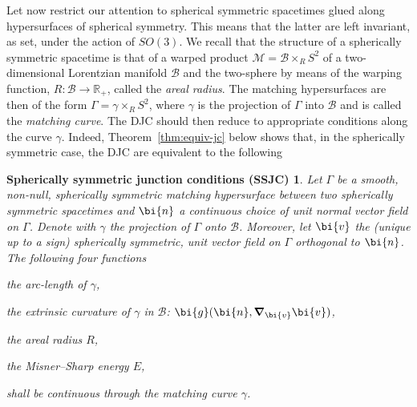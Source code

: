 \documentclass
[rmp,aps,twocolumn,showpacs,preprintnumbers,amsmath,amssymb]{revtex4}
\theoremstyle{plain}
\newtheorem*{SSJC}{Spherically symmetric junction conditions (SSJC)}
\theoremstyle{definition}
\theoremstyle{remark}
\newcommand{\bnabla}{\boldsymbol{\nabla}}     %
\newcommand{\M}{\mathcal{M}}                      %
\newcommand{\B}{\mathcal{B}}                      %
\newcommand{\Stwo}{{S^2}}                         %
\newcommand{\g}{\bg}                            %
\newcommand{\bg}{\bi{g}}
\newcommand{\bn}{\bi{n}}
\newcommand{\bv}{\bi{v}}
\begin{document}
Let now restrict our attention to spherical symmetric spacetimes 
glued along hypersurfaces of spherical symmetry. This means that 
the latter are left invariant, as set, under the action of $SO(3)$. 
We recall that the structure of a spherically symmetric spacetime 
is that of a warped product $\M=\B\times_R\Stwo$ of a two-dimensional 
Lorentzian manifold $\B$ and the two-sphere by means of the warping 
function, $R:\B\rightarrow\mathbb{R}_+$, called the \emph{areal radius}.
The matching hypersurfaces are then of the form 
$\varGamma=\gamma\times_R\Stwo$, where $\gamma$ is the projection 
of $\varGamma$ into $\B$ and is called the \emph{matching curve}. The 
DJC should then reduce to appropriate conditions along the curve 
$\gamma$. Indeed, Theorem~\ref{thm:equiv-jc} below shows that, 
in the spherically symmetric case, the DJC are equivalent to the 
following

\begin{SSJC}\label{thm:SSJC}
Let $\varGamma$ be a smooth, non-null, spherically symmetric matching 
hypersurface between two spherically symmetric spacetimes and $\bn$ a 
continuous choice of unit normal vector field on $\varGamma$. Denote 
with $\gamma$ the projection of $\varGamma$ onto $\B$. Moreover, let 
$\bv$ the (unique up to a sign) spherically symmetric, unit vector 
field on $\varGamma$ orthogonal to $\bn$. The following four functions 
%
\begin{compactenum}[$\hspace{3ex} (i)$]
\item the arc-length of $\gamma$,
\item the extrinsic curvature of $\gamma$ in $\B$: $\g(\bn,\bnabla_\bv\bv)$,
\item the areal radius $R$, 
\item the Misner--Sharp energy $E$,
\end{compactenum}
%
shall be continuous through the matching curve $\gamma$.
\end{SSJC}
\end{document}
